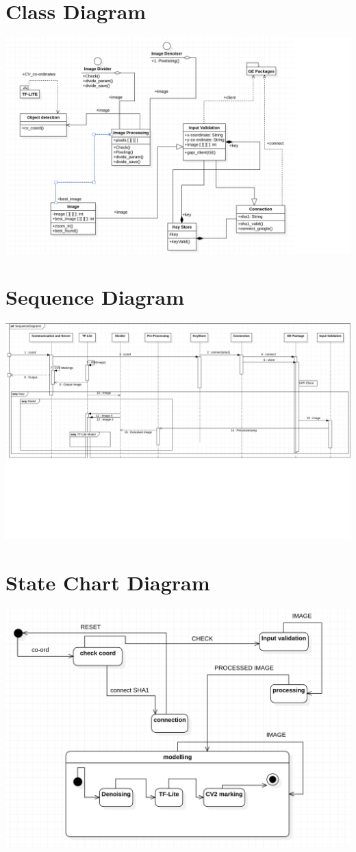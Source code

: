\section{Class Diagram}
\includegraphics[scale=0.46]{images/class.png}
\section{Sequence Diagram}
\includegraphics[scale=0.38]{images/seq.png}
\section{State Chart Diagram}
\includegraphics[scale=0.4]{images/statechart.png}
